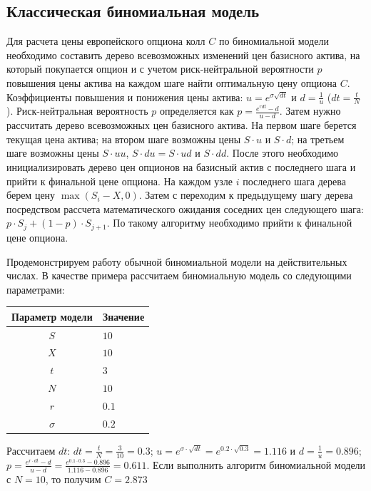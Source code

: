 \documentclass[a4paper, 12pt]{extarticle}
\begin{document}
	\subsection{Классическая биномиальная модель}
	Для расчета цены европейского опциона колл $C$ по биномиальной модели необходимо составить дерево всевозможных изменений цен базисного актива, на который покупается опцион и с учетом риск-нейтральной вероятности $p$ повышения цены актива на каждом шаге найти оптимальную цену опциона $C$. Коэффициенты повышения и понижения цены актива: $u=e^{\sigma \sqrt{dt}}$ и $d=\frac{1}{u}$ ($dt = \frac{t}{N}$). Риск-нейтральная вероятность $p$ определяется как $p=\frac{e^{r dt}-d}{u-d}$. Затем нужно рассчитать дерево всевозможных цен базисного актива. На первом шаге берется текущая цена актива; на втором шаге возможны цены $S \cdot u$ и $S \cdot d$; на третьем шаге возможны цены $S \cdot uu$, $S \cdot du=S \cdot ud$ и $S \cdot dd$. После этого необходимо инициализировать дерево цен опционов на базисный актив с последнего шага и прийти к финальной цене опциона. На каждом узле $i$ последнего шага дерева берем цену $\max{(S_i-X, 0)}$. Затем с переходим к предыдущему шагу дерева посредством рассчета математического ожидания соседних цен следующего шага: $p \cdot S_{j} + (1-p) \cdot S_{j+1}$. По такому алгоритму необходимо прийти к финальной цене опциона. 
	
	Продемонстрируем работу обычной биномиальной модели на действительных числах. В качестве примера рассчитаем биномиальную модель со следующими параметрами:
	\begin{center}
		\begin{tabular}{|c|l|}
			\hline
			\textbf{Параметр модели} & \textbf{Значение} \\
			\hline
			$S$ & $10$ \\
			$X$ & $10$ \\
			$t$ & $3$ \\
			$N$ & $10$ \\
			$r$ & $0.1$ \\
			$\sigma$ & $0.2$ \\
			\hline
		\end{tabular}
	\end{center}
	
	Рассчитаем $dt$: $dt = \frac{t}{N}=\frac{3}{10}=0.3$; $u=e^{\sigma \cdot \sqrt{dt}}=e^{0.2 \cdot \sqrt{0.3}}=1.116$ и $d=\frac{1}{u}=0.896$; $p=\frac{e^{r \cdot dt}-d}{u-d}=\frac{e^{0.1 \cdot 0.3}-0.896}{1.116-0.896}=0.611$. Если выполнить алгоритм биномиальной модели с $N=10$, то получим $C=2.873$
	
\end{document}
